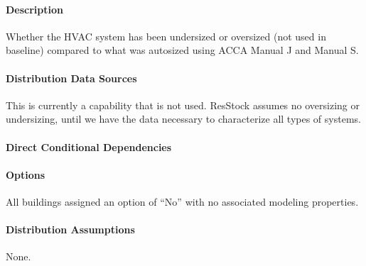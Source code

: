 \paragraph{Description}
% 
Whether the HVAC system has been undersized or oversized (not used in baseline) compared to what was autosized using ACCA Manual J and Manual S.

\paragraph{Distribution Data Sources}
% 
This is currently a capability that is not used. ResStock assumes no oversizing or undersizing, until we have the data necessary to characterize all types of systems.

\paragraph{Direct Conditional Dependencies}


\paragraph{Options}
All buildings assigned an option of ``No'' with no associated modeling properties.

\paragraph{Distribution Assumptions}
% 
None.

